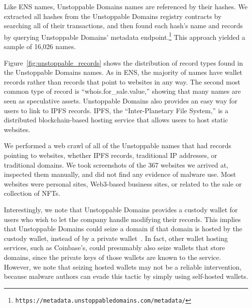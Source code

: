 Like ENS names, Unstoppable Domains names are referenced by their hashes. We 
extracted all hashes from the Unstoppable Domains registry contracts by 
searching all of their transactions, and then found each hash's name and 
records by querying Unstoppable Domains' metadata endpoint.\footnote{	
\texttt{https://metadata.unstoppabledomains.com/metadata/}} This approach 
yielded a sample of 16,026 names. 


Figure~\ref{fig:unstoppable_records} shows the distribution 
of record types found in the Unstoppable Domains names. As in 
ENS, the majority of names have wallet records rather than 
records that point to websites in any way. The second most common 
type of record is ``whois.for\_sale.value,'' showing that many 
names are seen as speculative assets. Unstoppable Domains also 
provides an easy way for users to link to IPFS records. IPFS, 
the ``Inter-Planetary File System,'' is a distributed 
blockchain-based hosting service that allows users to host 
static websites.

We performed a web crawl of all of the Unstoppable names that 
had records pointing to websites, whether IPFS records, 
traditional IP addresses, or traditional domains. We took 
screenshots of the 367 websites we arrived 
at, inspected them manually, and did not find any evidence of 
malware use. Most 
websites were personal sites, Web3-based business sites, or related to the sale 
or collection of NFTs. 

Interestingly, we note that
Unstoppable Domains provides a custody wallet for users who wish to let the 
company handle modifying their records. This implies that Unstoppable Domains 
could seize a domain if that domain is hosted by 
the custody wallet, instead of by a private 
wallet~\cite{pegoraro_blockchain_2021}. In fact, other wallet hosting services, 
such as Coinbase's, could presumably also seize wallets that store domains, 
since the private keys of those wallets are known to the service. However, we 
note that seizing hosted wallets may not be a reliable intervention, because 
malware authors can evade this tactic by simply using self-hosted wallets. 


